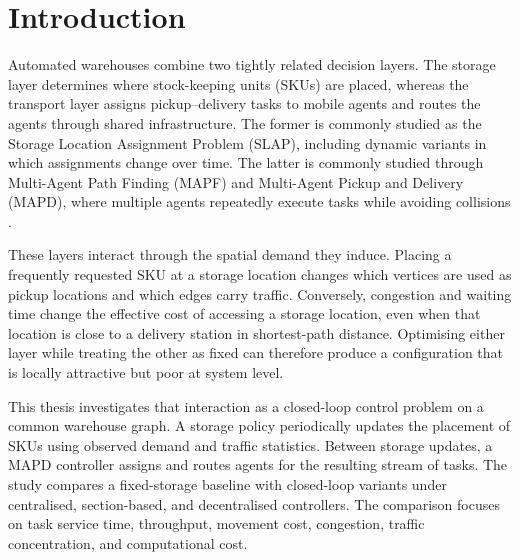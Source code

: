 \documentclass[../main.tex]{subfiles}
\begin{document}
\onecolumn

%

\section{Introduction}
\label{sec:introduction}

Automated warehouses combine two tightly related decision layers. The storage
layer determines where stock-keeping units (SKUs) are placed, whereas the
transport layer assigns pickup--delivery tasks to mobile agents and routes the
agents through shared infrastructure. The former is commonly studied as the
Storage Location Assignment Problem (SLAP), including dynamic variants in
which assignments change over time. The latter is commonly studied through
Multi-Agent Path Finding (MAPF) and Multi-Agent Pickup and Delivery (MAPD),
where multiple agents repeatedly execute tasks while avoiding collisions
\cite{ma2017lifelong,salzman2020research,silva2020integrating}.

These layers interact through the spatial demand they induce. Placing a
frequently requested SKU at a storage location changes which vertices are used
as pickup locations and which edges carry traffic. Conversely, congestion and
waiting time change the effective cost of accessing a storage location, even
when that location is close to a delivery station in shortest-path distance.
Optimising either layer while treating the other as fixed can therefore produce
a configuration that is locally attractive but poor at system level.

This thesis investigates that interaction as a closed-loop control problem on
a common warehouse graph. A storage policy periodically updates the placement
of SKUs using observed demand and traffic statistics. Between storage updates,
a MAPD controller assigns and routes agents for the resulting stream of tasks.
The study compares a fixed-storage baseline with closed-loop variants under
centralised, section-based, and decentralised controllers. The comparison
focuses on task service time, throughput, movement cost, congestion, traffic
concentration, and computational cost.
\end{document}
